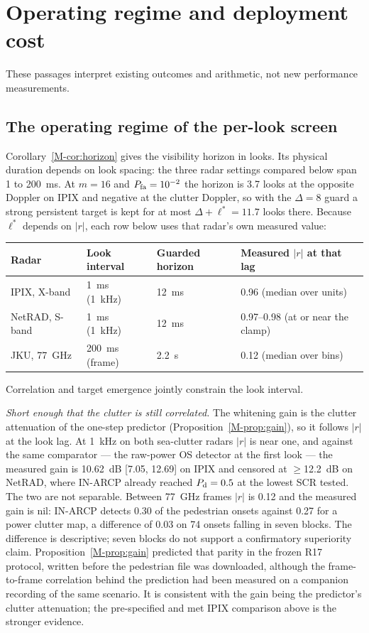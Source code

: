 \documentclass[10pt]{article}
\begin{document}
\section{Operating regime and deployment cost}\label{sup:r18}
These passages interpret existing outcomes and arithmetic, not new performance measurements.

\subsection{The operating regime of the per-look screen}\label{sup:regime}
Corollary~\ref{M-cor:horizon} gives the visibility horizon in looks. Its physical duration depends on look spacing: the three radar settings compared below span 1 to 200~ms. At $m=16$ and $P_{\rm fa}=10^{-2}$ the horizon is
3.7 looks at the opposite Doppler on IPIX and negative at the clutter Doppler, so with
the $\Delta=8$ guard a strong persistent target is kept for at most
$\Delta+\ell^{\ast}=11.7$ looks there. Because $\ell^{\ast}$ depends on $|r|$, each
row below uses that radar's own measured value:

\begin{center}\small
\begin{tabular}{llll}
\toprule
Radar & Look interval & Guarded horizon & Measured $|r|$ at that lag\\
\midrule
IPIX, X-band & 1~ms (1~kHz) & 12~ms & 0.96 (median over units)\\
NetRAD, S-band & 1~ms (1~kHz) & 12~ms & 0.97--0.98 (at or near the clamp)\\
JKU, 77~GHz & 200~ms (frame) & 2.2~s & 0.12 (median over bins)\\
\bottomrule
\end{tabular}
\end{center}

\noindent Correlation and target emergence jointly constrain the look interval.

\emph{Short enough that the clutter is still correlated.} The whitening gain is the clutter
attenuation of the one-step predictor (Proposition~\ref{M-prop:gain}), so it follows $|r|$ at
the look lag. At 1~kHz on both sea-clutter radars $|r|$ is near one, and against the same
comparator --- the raw-power OS detector at the first look --- the measured gain is 10.62~dB
[7.05, 12.69] on IPIX and censored at $\ge$12.2~dB on NetRAD, where IN-ARCP already reached
$P_{\rm d}=0.5$ at the lowest SCR tested. The two are not separable. Between 77~GHz frames
$|r|$ is 0.12 and the measured gain is nil: IN-ARCP detects 0.30 of the pedestrian onsets
against 0.27 for a power clutter map, a difference of 0.03 on 74 onsets falling in seven
blocks. The difference is descriptive; seven blocks do not support a confirmatory superiority claim. Proposition~\ref{M-prop:gain} predicted
that parity in the frozen R17 protocol, written before the pedestrian file was downloaded,
although the frame-to-frame correlation behind the prediction had been measured on a companion
recording of the same scenario. It is consistent with the gain being the predictor's clutter
attenuation; the pre-specified and met IPIX comparison above is the stronger evidence.
\end{document}
